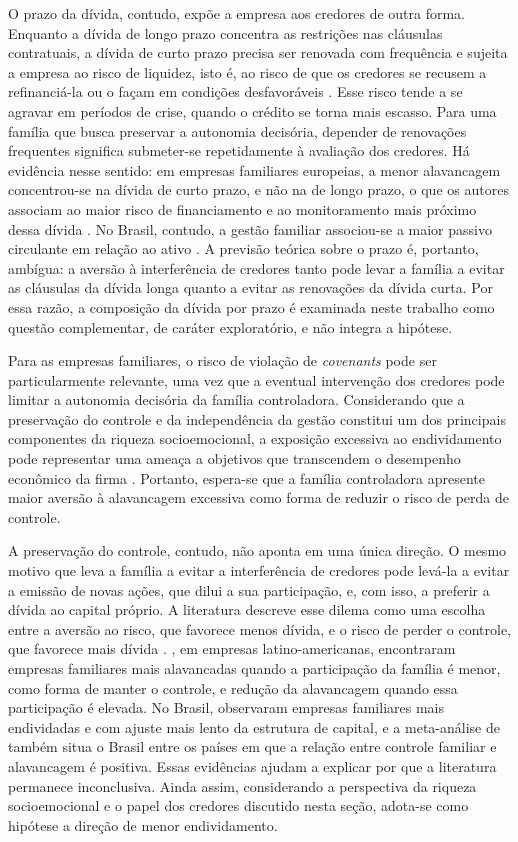O prazo da dívida, contudo, expõe a empresa aos credores de outra forma. Enquanto a
dívida de longo prazo concentra as restrições nas cláusulas contratuais, a dívida
de curto prazo precisa ser renovada com frequência e sujeita a empresa ao risco de
liquidez, isto é, ao risco de que os credores se recusem a refinanciá-la ou o
façam em condições desfavoráveis \cite{diamond1991}. Esse risco tende a se agravar
em períodos de crise, quando o crédito se torna mais escasso. Para uma família que
busca preservar a autonomia decisória, depender de renovações frequentes significa
submeter-se repetidamente à avaliação dos credores. Há evidência nesse sentido: em
empresas familiares europeias, a menor alavancagem concentrou-se na dívida de curto
prazo, e não na de longo prazo, o que os autores associam ao maior risco de
financiamento e ao monitoramento mais próximo dessa dívida
\cite[p.~3219]{munoz2024}. No Brasil, contudo, a gestão familiar associou-se a
maior passivo circulante em relação ao ativo \cite{monteiro2019}. A previsão teórica sobre o
prazo é, portanto, ambígua: a aversão à interferência de credores tanto pode levar
a família a evitar as cláusulas da dívida longa quanto a evitar as renovações da
dívida curta. Por essa razão, a composição da dívida por prazo é examinada neste
trabalho como questão complementar, de caráter exploratório, e não integra a
hipótese.

Para as empresas familiares, o risco de violação de \textit{covenants} pode ser
particularmente relevante, uma vez que a eventual intervenção dos credores pode
limitar a autonomia decisória da família controladora. Considerando que a
preservação do controle e da independência da gestão constitui um dos principais
componentes da riqueza socioemocional, a exposição excessiva ao endividamento pode
representar uma ameaça a objetivos que transcendem o desempenho econômico da firma
\cite{santos2018,pestana2021}. Portanto, espera-se que a família controladora
apresente maior aversão à alavancagem excessiva como forma de reduzir o risco de
perda de controle.

A preservação do controle, contudo, não aponta em uma única direção. O mesmo
motivo que leva a família a evitar a interferência de credores pode levá-la a
evitar a emissão de novas ações, que dilui a sua participação, e, com isso, a
preferir a dívida ao capital próprio. A literatura descreve esse dilema como uma
escolha entre a aversão ao risco, que favorece menos dívida, e o risco de perder o
controle, que favorece mais dívida \cite{gonzalez2013}. , em empresas
latino-americanas, encontraram empresas familiares mais alavancadas quando a
participação da família é menor, como forma de manter o controle, e redução da
alavancagem quando essa participação é elevada. No Brasil, 
observaram empresas familiares mais endividadas e com ajuste mais lento da
estrutura de capital, e a meta-análise de  também situa o
Brasil entre os países em que a relação entre controle familiar e alavancagem é
positiva. Essas evidências ajudam a explicar por que a literatura
permanece inconclusiva. Ainda assim, considerando a perspectiva da riqueza
socioemocional e o papel dos credores discutido nesta seção, adota-se como
hipótese a direção de menor endividamento.

